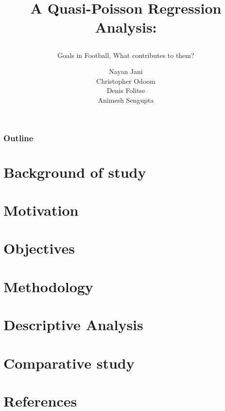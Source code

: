 \documentclass[11pt]{beamer}
\begin{document}
	\author{Nayan Jani\\
		Christopher Odoom\\
		Denis Folitse\\
		Animesh Sengupta}
	\title{\bf{A Quasi-Poisson Regression Analysis:\\}
     \subtitle{Goals in Football, What contributes to them? }}

	\begin{frame}[plain]
		\maketitle
	\end{frame}
 
  \begin{frame}
 
		\frametitle{Outline}
\tableofcontents
\section{Background of study}
\section{Motivation}
\section{Objectives}
\section{Methodology}
\section{Descriptive Analysis}
\section{Comparative study}
\section{References}
  
  \end{frame}
  
\end{document}
